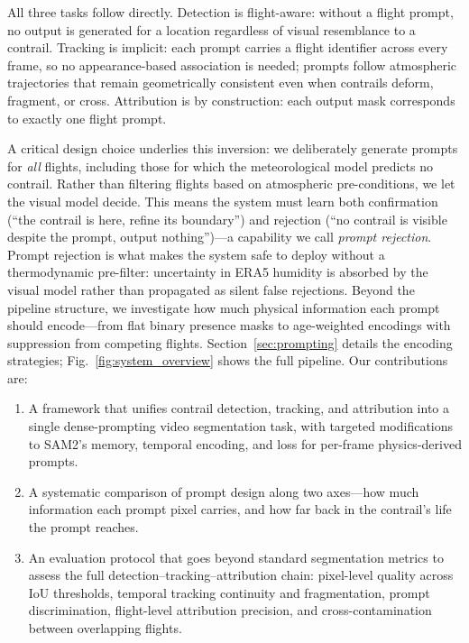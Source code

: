 \documentclass[review]{elsarticle}
\begin{document}
All three tasks follow directly. Detection is flight-aware: without a flight prompt, no output is generated for a location regardless of visual resemblance to a contrail. Tracking is implicit: each prompt carries a flight identifier across every frame, so no appearance-based association is needed; prompts follow atmospheric trajectories that remain geometrically consistent even when contrails deform, fragment, or cross. Attribution is by construction: each output mask corresponds to exactly one flight prompt.

A critical design choice underlies this inversion: we deliberately generate prompts for \emph{all} flights, including those for which the meteorological model predicts no contrail. Rather than filtering flights based on atmospheric pre-conditions, we let the visual model decide. This means the system must learn both confirmation (``the contrail is here, refine its boundary'') and rejection (``no contrail is visible despite the prompt, output nothing'')---a capability we call \emph{prompt rejection}. Prompt rejection is what makes the system safe to deploy without a thermodynamic pre-filter: uncertainty in ERA5 humidity is absorbed by the visual model rather than propagated as silent false rejections. Beyond the pipeline structure, we investigate how much physical information each prompt should encode---from flat binary presence masks to age-weighted encodings with suppression from competing flights. Section~\ref{sec:prompting} details the encoding strategies; Fig.~\ref{fig:system_overview} shows the full pipeline. Our contributions are:
\begin{enumerate}
    \item A framework that unifies contrail detection, tracking, and attribution into a single dense-prompting video segmentation task, with targeted modifications to SAM2's memory, temporal encoding, and loss for per-frame physics-derived prompts.
    \item A systematic comparison of prompt design along two axes---how much information each prompt pixel carries, and how far back in the contrail's life the prompt reaches. 
    \item An evaluation protocol that goes beyond standard segmentation metrics to assess the full detection--tracking--attribution chain: pixel-level quality across IoU thresholds, temporal tracking continuity and fragmentation, prompt discrimination, flight-level attribution precision, and cross-contamination between overlapping flights.
\end{enumerate}
\end{document}
